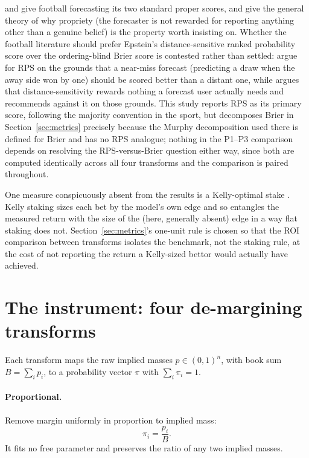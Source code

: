 \documentclass[11pt,a4paper]{article}
\begin{document}
\citet{brier1950} and \citet{epstein1969} give football forecasting its two
standard proper scores, and \citet{gneiting2007} give the general theory of
why propriety (the forecaster is not rewarded for reporting anything other
than a genuine belief) is the property worth insisting on. Whether the
football literature should prefer Epstein's distance-sensitive ranked
probability score over the ordering-blind Brier score is contested rather
than settled: \citet{constantinou2012} argue for RPS on the grounds that a
near-miss forecast (predicting a draw when the away side won by one) should
be scored better than a distant one, while \citet{wheatcroft2021} argues that
distance-sensitivity rewards nothing a forecast user actually needs and
recommends against it on those grounds. This study reports RPS as its primary
score, following the majority convention in the sport, but decomposes Brier
in Section~\ref{sec:metrics} precisely because the Murphy decomposition
\citep{murphy1973} used there is defined for Brier and has no RPS analogue;
nothing in the P1--P3 comparison depends on resolving the RPS-versus-Brier
question either way, since both are computed identically across all four
transforms and the comparison is paired throughout.

One measure conspicuously absent from the results is a Kelly-optimal stake
\citep{kelly1956}. Kelly staking sizes each bet by the model's own edge and
so entangles the measured return with the size of the (here, generally
absent) edge in a way flat staking does not. Section~\ref{sec:metrics}'s
one-unit rule is chosen so that the ROI comparison between transforms
isolates the benchmark, not the staking rule, at the cost of not reporting
the return a Kelly-sized bettor would actually have achieved.

\section{The instrument: four de-margining transforms}
\label{sec:transforms}

Each transform maps the raw implied masses $p \in (0,1)^n$, with book sum
$B = \sum_i p_i$, to a probability vector $\pi$ with $\sum_i \pi_i = 1$.

\paragraph{Proportional.} Remove margin uniformly in proportion to implied
mass:
\begin{equation}
  \pi_i = \frac{p_i}{B}.
\end{equation}
It fits no free parameter and preserves the ratio of any two implied masses.
\end{document}
